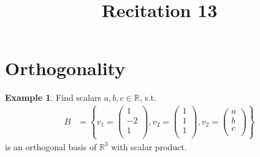 \documentclass[fleqn, a4paper, 12pt]{article}
\title{Recitation 13}
\author{}
\date{\formatdate{14}{1}{2015}}
\theoremstyle{definition}
\newtheorem{example}{Example}
\theoremstyle{theorem}
\begin{document}
\maketitle

\tableofcontents

\newpage
\section{Orthogonality}

\begin{example}
	Find scalars $a, b, c \in \mathbb{R}$, s.t. 
	\begin{align*}
		B &= 
			\left\lbrace
				v_1 = 
					\begin{pmatrix}
						1\\
						-2\\
						1\\
					\end{pmatrix}
				,
				v_2 = 
					\begin{pmatrix}
						1\\
						1\\
						1\\
					\end{pmatrix}
				,
				v_2 = 
					\begin{pmatrix}
						a\\
						b\\
						c\\
					\end{pmatrix}
			\right\rbrace
	\end{align*}
	is an orthogonal basis of $\mathbb{R}^3$ with scalar product.
\end{example}
\end{document}
